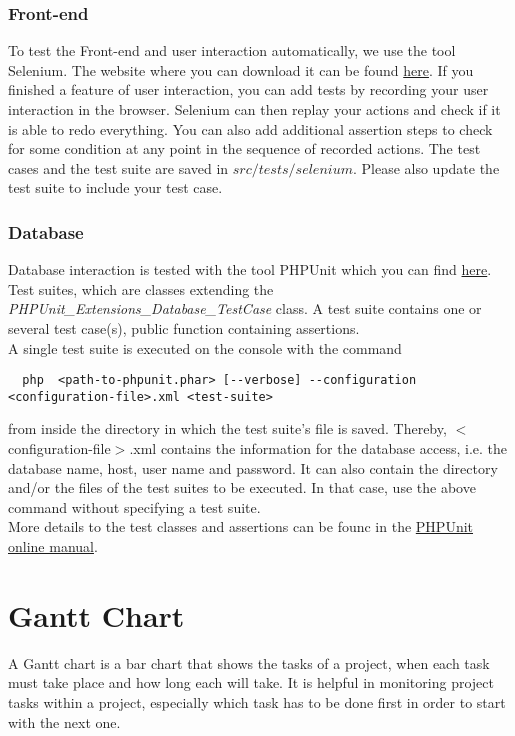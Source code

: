 \documentclass[twoside,12pt,a4paper]{article}
\begin{document}
\subsubsection{Front-end}
To test the Front-end and user interaction automatically, we use the tool Selenium. The website where you can download it can be found \href{http://www.seleniumhq.org/}{here}. If you finished a feature of user interaction, you can add tests by recording your user interaction in the browser. Selenium can then replay your actions and check if it is able to redo everything. You can also add additional assertion steps to check for some condition at any point in the sequence of recorded actions. The test cases and the test suite are saved in $src/tests/selenium$. Please also update the test suite to include your test case.

\subsubsection{Database}
Database interaction is tested with the tool PHPUnit which you can find \href{https://phpunit.de}{here}. Test suites, which are classes extending the \mbox{\emph{PHPUnit\_Extensions\_Database\_TestCase}} class. A test suite contains one or several test case(s), public function containing assertions. \\
A single test suite is executed on the console with the command

\begin{lstlisting}
  php  <path-to-phpunit.phar> [--verbose] --configuration <configuration-file>.xml <test-suite>
\end{lstlisting}

from inside the directory in which the test suite's file is saved. Thereby, $<$configuration-file$>$.xml contains the information for the database access, i.e. the database name, host, user name and password. It can also contain the directory and/or the files of the test suites to be executed. In that case, use the above command without specifying a test suite. \\
More details to the test classes and assertions can be founc in the \href{https://phpunit.de/manual/current/en/}{PHPUnit online manual}.
\newpage

\section{Gantt Chart} %
\label{sec:gantt_chart}

A Gantt chart is a bar chart that shows the tasks of a project, when each task must take place and how long each will take. It is helpful in monitoring project tasks within a project, especially which task has to be done first in order to start with the next one.
\end{document}
